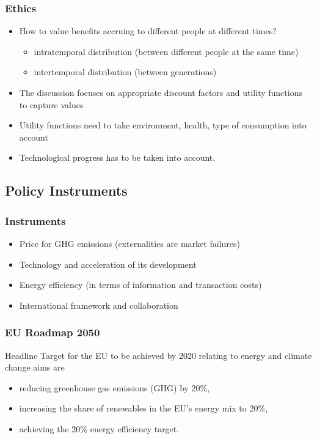 
\begin{frame}
\frametitle{Ethics}
\begin{itemize}
\item<1-> How to value benefits accruing to different people at different times?
\begin{itemize}
\item intratemporal distribution (between different people at the same time)
\item intertemporal distribution (between generations)
\end{itemize}
\item<2-> The discussion focuses on appropriate discount factors and utility functions to capture values
\item<3-> Utility functions need to take environment, health, type of consumption into account
\item<4-> Technological progress has to be taken into account.
\end{itemize}
\end{frame}

\subsection{Policy Instruments}

\begin{frame}
\frametitle{Instruments}
\begin{itemize}
\item<1-> Price for GHG emissions (externalities are market failures)
\item<2-> Technology and acceleration of its development
\item<3-> Energy efficiency (in terms of information and transaction costs)
\item<4-> International framework and collaboration
\end{itemize}
\end{frame}


\begin{frame}
 \frametitle{EU Roadmap 2050}
Headline Target for the EU to be achieved by 2020 relating to energy and climate change aims are
\begin{itemize}
\item<1-> reducing greenhouse gas emissions (GHG) by 20\%,
\item<2-> increasing the share of renewables in the EU's energy mix to 20\%,
\item<3-> achieving the 20\% energy efficiency target.
\end{itemize}
\end{frame} %

